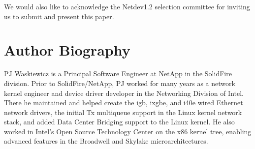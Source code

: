 \documentclass[letterpaper]{article}
\begin{document}
We would also like to acknowledge the Netdev1.2 selection committee for inviting us to submit and present this paper.




\section{Author Biography}
PJ Waskiewicz is a Principal Software Engineer at NetApp in the SolidFire division. Prior to SolidFire/NetApp, PJ worked for many years as a network kernel engineer and device driver developer in the Networking Division of Intel. There he maintained and helped create the igb, ixgbe, and i40e wired Ethernet network drivers, the initial Tx multiqueue support in the Linux kernel network stack, and added Data Center Bridging support to the Linux kernel. He also worked in Intel's Open Source Technology Center on the x86 kernel tree, enabling advanced features in the Broadwell and Skylake microarchitectures.
\end{document}
